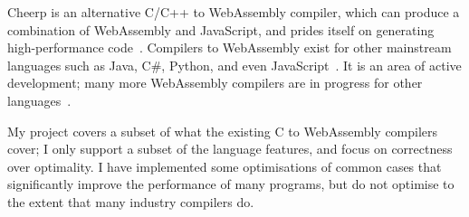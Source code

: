 \documentclass[00-main.tex]{subfiles}
\begin{document}
Cheerp is an alternative C/C++ to WebAssembly compiler, which can produce a combination of WebAssembly and JavaScript, and prides itself on generating high-performance code~.
Compilers to WebAssembly exist for other mainstream languages such as Java, C\#, Python, and even JavaScript~.
It is an area of active development; many more WebAssembly compilers are in progress for other languages~.

My project covers a subset of what the existing C to WebAssembly compilers cover; I only support a subset of the language features, and focus on correctness over optimality.
I have implemented some optimisations of common cases that significantly improve the performance of many programs, but do not optimise to the extent that many industry compilers do.
\end{document}

